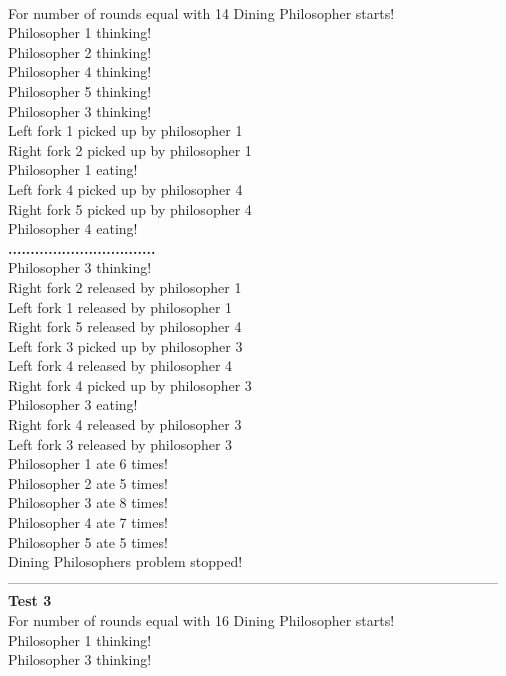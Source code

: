 \documentclass[14pt]{article}
\begin{document}
\\For number of rounds equal with 14 Dining Philosopher starts!
\\Philosopher 1 thinking!
\\Philosopher 2 thinking!
\\Philosopher 4 thinking!
\\Philosopher 5 thinking!
\\Philosopher 3 thinking!
\\Left fork 1 picked up by philosopher 1
\\Right fork 2 picked up by philosopher 1
\\Philosopher 1 eating!
\\Left fork 4 picked up by philosopher 4
\\Right fork 5 picked up by philosopher 4
\\Philosopher 4 eating!
\\\textbf{.................................}
\\Philosopher 3 thinking!
\\Right fork 2 released by philosopher 1
\\Left fork 1 released by philosopher 1
\\Right fork 5 released by philosopher 4
\\Left fork 3 picked up by philosopher 3
\\Left fork 4 released by philosopher 4
\\Right fork 4 picked up by philosopher 3
\\Philosopher 3 eating!
\\Right fork 4 released by philosopher 3
\\Left fork 3 released by philosopher 3
\\Philosopher 1 ate 6 times!
\\Philosopher 2 ate 5 times!
\\Philosopher 3 ate 8 times!
\\Philosopher 4 ate 7 times!
\\Philosopher 5 ate 5 times!
\\Dining Philosophers problem stopped!
\\---------------------------------------------------------------------------------------------------------
\\\textbf{Test 3}
\\For number of rounds equal with 16 Dining Philosopher starts!
\\Philosopher 1 thinking!
\\Philosopher 3 thinking!
\end{document}
